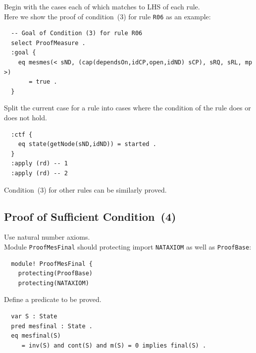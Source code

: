 \documentclass[12pt]{report}
\begin{document}
 Begin with the cases each of which matches to
LHS of each rule. \\ 
Here we show the proof of condition~(3) for rule {\tt R06}
as an example:
\small
\begin{verbatim}
  -- Goal of Condition (3) for rule R06
  select ProofMeasure .
  :goal {
    eq mesmes(< sND, (cap(dependsOn,idCP,open,idND) sCP), sRQ, sRL, mp >)
       = true .
  }
\end{verbatim}
\normalsize

 Split the current case for a rule into
cases where the condition of the rule does or does not hold. 
\small
\begin{verbatim}
  :ctf {
    eq state(getNode(sND,idND)) = started .
  }
  :apply (rd) -- 1
  :apply (rd) -- 2
\end{verbatim}
\normalsize
Condition~(3) for other rules can be similarly proved.

\subsection{Proof of Sufficient Condition~(4)}
\label{sec:TOSCAmesfinal}
 Use natural number axioms. \\
Module {\tt ProofMesFinal} should protecting import {\tt NATAXIOM} as
well as {\tt ProofBase}:
\small
\begin{verbatim}
  module! ProofMesFinal {
    protecting(ProofBase)
    protecting(NATAXIOM)
\end{verbatim}
\normalsize

 Define a predicate to be proved.
\small
\begin{verbatim}
  var S : State
  pred mesfinal : State .
  eq mesfinal(S)
     = inv(S) and cont(S) and m(S) = 0 implies final(S) .
\end{verbatim}
\normalsize
\end{document}
